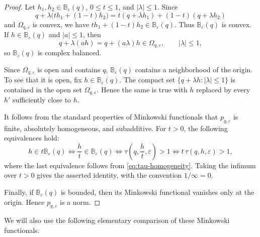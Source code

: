 \documentclass[11pt]{article}
\theoremstyle{definition}
\newcommand{\eps}{\varepsilon}
\begin{document}
\begin{proof}
	Let \(h_1,h_2\in\mathbb B_\eps(q)\), \(0\le t\le1\), and
	\(|\lambda|\le1\).  Since
	\[
	q+\lambda\bigl(th_1+(1-t)h_2\bigr)
	=
	t(q+\lambda h_1)+(1-t)(q+\lambda h_2)
	\]
	and \(\Omega_{q,\eps}\) is convex, we have
	\(th_1+(1-t)h_2\in\mathbb B_\eps(q)\).  Thus
	\(\mathbb B_\eps(q)\) is convex.  If
	\(h\in\mathbb B_\eps(q)\) and \(|a|\le1\), then
	\[
	q+\lambda(ah)=q+(a\lambda)h\in\Omega_{q,\eps},
	\qquad |\lambda|\le1,
	\]
	so \(\mathbb B_\eps(q)\) is complex balanced.
	
	Since \(\Omega_{q,\eps}\) is open and contains \(q\),
	\(\mathbb B_\eps(q)\) contains a neighborhood of the origin.  To see
	that it is open, fix \(h\in\mathbb B_\eps(q)\).  The compact set
	\(\{q+\lambda h:|\lambda|\le1\}\)
	is contained in the open set \(\Omega_{q,\eps}\).  Hence the same is
	true with \(h\) replaced by every \(h'\) sufficiently close to \(h\).
	
	It follows from the standard properties of Minkowski functionals that
	\(p_{q,\eps}\) is finite, absolutely homogeneous, and subadditive.
	For \(t>0\), the following equivalences hold:
	\[
		h\in t\mathbb B_\eps(q)
	\iff
		\frac{h}{t}\in\mathbb B_\eps(q)\iff
		\tau\left(q,\frac{h}{t},\eps\right)>1\iff
		t\,\tau(q,h,\eps)>1,
	\]
	where the last equivalence follows from
	\eqref{eq:tau-homogeneity}.  Taking the infimum over \(t>0\) gives
	the asserted identity, with the convention \(1/\infty=0\).
	
	Finally, if \(\mathbb B_\eps(q)\) is bounded, then its Minkowski
	functional vanishes only at the origin.  Hence \(p_{q,\eps}\) is a
	norm.
\end{proof}




























We will also use the following elementary comparison of these
Minkowski functionals.
\end{document}
